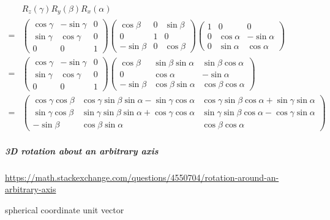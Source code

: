 \documentclass[
]{book}
\theoremstyle{definition}
\theoremstyle{definition}
\theoremstyle{definition}
\theoremstyle{definition}
\theoremstyle{remark}
\begin{document}
\[
\begin{aligned}
 & R_{{\scriptscriptstyle z}}\left(\gamma\right)R_{{\scriptscriptstyle y}}\left(\beta\right)R_{{\scriptscriptstyle x}}\left(\alpha\right)\\
= & \begin{pmatrix}\cos\gamma & -\sin\gamma & 0\\
\sin\gamma & \cos\gamma & 0\\
0 & 0 & 1
\end{pmatrix}\begin{pmatrix}\cos\beta & 0 & \sin\beta\\
0 & 1 & 0\\
-\sin\beta & 0 & \cos\beta
\end{pmatrix}\begin{pmatrix}1 & 0 & 0\\
0 & \cos\alpha & -\sin\alpha\\
0 & \sin\alpha & \cos\alpha
\end{pmatrix}\\
= & \begin{pmatrix}\cos\gamma & -\sin\gamma & 0\\
\sin\gamma & \cos\gamma & 0\\
0 & 0 & 1
\end{pmatrix}\begin{pmatrix}\cos\beta & \sin\beta\sin\alpha & \sin\beta\cos\alpha\\
0 & \cos\alpha & -\sin\alpha\\
-\sin\beta & \cos\beta\sin\alpha & \cos\beta\cos\alpha
\end{pmatrix}\\
= & \begin{pmatrix}\cos\gamma\cos\beta & \cos\gamma\sin\beta\sin\alpha-\sin\gamma\cos\alpha & \cos\gamma\sin\beta\cos\alpha+\sin\gamma\sin\alpha\\
\sin\gamma\cos\beta & \sin\gamma\sin\beta\sin\alpha+\cos\gamma\cos\alpha & \sin\gamma\sin\beta\cos\alpha-\cos\gamma\sin\alpha\\
-\sin\beta & \cos\beta\sin\alpha & \cos\beta\cos\alpha
\end{pmatrix}
\end{aligned}
\]

\subparagraph{3D rotation about an arbitrary axis}\label{d-rotation-about-an-arbitrary-axis}

\url{https://math.stackexchange.com/questions/4550704/rotation-around-an-arbitrary-axis}

spherical coordinate unit vector
\end{document}
